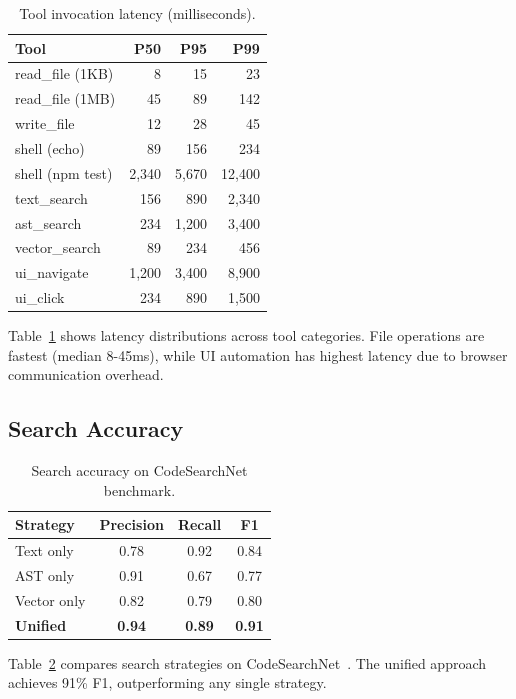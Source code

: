 \documentclass[11pt,twocolumn]{article}
\begin{document}
\begin{table}[h]
\centering
\caption{Tool invocation latency (milliseconds).}
\label{tab:latency}
\begin{tabular}{lrrr}
\toprule
\textbf{Tool} & \textbf{P50} & \textbf{P95} & \textbf{P99} \\
\midrule
read\_file (1KB) & 8 & 15 & 23 \\
read\_file (1MB) & 45 & 89 & 142 \\
write\_file & 12 & 28 & 45 \\
shell (echo) & 89 & 156 & 234 \\
shell (npm test) & 2,340 & 5,670 & 12,400 \\
text\_search & 156 & 890 & 2,340 \\
ast\_search & 234 & 1,200 & 3,400 \\
vector\_search & 89 & 234 & 456 \\
ui\_navigate & 1,200 & 3,400 & 8,900 \\
ui\_click & 234 & 890 & 1,500 \\
\bottomrule
\end{tabular}
\end{table}

Table~\ref{tab:latency} shows latency distributions across tool categories. File operations are fastest (median 8-45ms), while UI automation has highest latency due to browser communication overhead.

\subsection{Search Accuracy}

\begin{table}[h]
\centering
\caption{Search accuracy on CodeSearchNet benchmark.}
\label{tab:search}
\begin{tabular}{lccc}
\toprule
\textbf{Strategy} & \textbf{Precision} & \textbf{Recall} & \textbf{F1} \\
\midrule
Text only & 0.78 & 0.92 & 0.84 \\
AST only & 0.91 & 0.67 & 0.77 \\
Vector only & 0.82 & 0.79 & 0.80 \\
\midrule
\textbf{Unified} & \textbf{0.94} & \textbf{0.89} & \textbf{0.91} \\
\bottomrule
\end{tabular}
\end{table}

Table~\ref{tab:search} compares search strategies on CodeSearchNet~\cite{codesearchnet2019}. The unified approach achieves 91\% F1, outperforming any single strategy.
\end{document}
